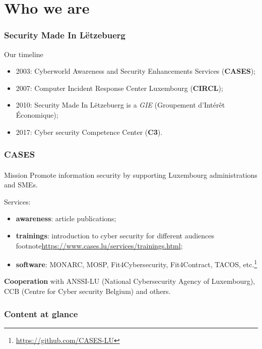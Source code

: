 %
%
\section*{Who we are}
\begin{frame}
    \frametitle{Security Made In Lëtzebuerg}
    Our timeline
    \begin{center}
        \begin{itemize}
            \item 2003: Cyberworld Awareness and Security Enhancements Services (\textbf{CASES});
            \item 2007: Computer Incident Response Center Luxembourg (\textbf{CIRCL});
            \item 2010: Security Made In Lëtzebuerg is a \textit{GIE} (Groupement d’Intérêt Économique);
            \item 2017: Cyber security Competence Center (\textbf{C3}).
        \end{itemize}
    \end{center}
\end{frame}

\begin{frame}
    \frametitle{CASES}
    \framesubtitle{}
    \begin{block}{Mission}
        Promote information security by supporting Luxembourg administrations and SMEs.
    \end{block}
    Services:
    \begin{center}
        \begin{itemize}
            \item \textbf{awareness}: article publications;
            \item \textbf{trainings}:
                introduction to cyber security for different audiences 
                footnote{\url{https://www.cases.lu/services/trainings.html}};
            \item \textbf{software}:
                MONARC, MOSP, Fit4Cybersecurity, Fit4Contract,
                TACOS, etc.\footnote{\url{https://github.com/CASES-LU}}
        \end{itemize}
    \end{center}
    \textbf{Cooperation} with
      ANSSI-LU (National Cybersecurity Agency of Luxembourg),
      CCB (Centre for Cyber security Belgium) and others.
\end{frame}

\setcounter{tocdepth}{1}
\begin{frame}
    \frametitle{Content at glance}
    \tableofcontents
\end{frame}
\setcounter{tocdepth}{4}

